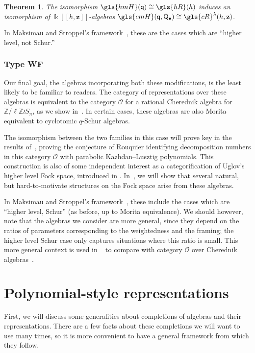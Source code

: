 \documentclass[10pt]{article}
\newtheorem{theorem}{Theorem}[section]
\theoremstyle{definition}
\newcommand{\Bz}{\mathbf{z}}
\newcommand{\pq}{\mathsf{q}}
\newcommand{\K}{\Bbbk}%
\newcommand{\Z}{\mathbb{Z}}
\newcommand{\la}{\lambda}
\newcommand{\PQ}{\mathsf{Q}}
\newcommand{\cO}{\mathcal{O}}
\newcommand{\hmH}{\gls{hmH}}
\newcommand{\hR}{\gls{hR}}
\newcommand\llbracket{[\![}
\newcommand\rrbracket{]\!]}
\begin{document}
\begin{theorem}
 The isomorphism $\hmH(\pq)\cong \hR(h)$ induces an isomorphism of
 $\K\llbracket h,\Bz\rrbracket $-algebras $\gls{cmH}(\pq,\PQ_\bullet)\cong \gls{cR}^{\la}(h,\Bz)$.
\end{theorem}


In Maksimau and Stroppel's framework~\cite{MS18}, these are the cases which are
 ``higher level, not Schur.''

\subsubsection*{Type WF} 

Our final goal, the algebras incorporating both these modifications,
is the least likely to be familiar to readers. The category of
representations over these algebras is equivalent to the category
$\cO$ for a rational Cherednik algebra for $\Z/\ell\Z \wr S_n $, as
we show in~\cite{WebRou}. In certain cases, these algebras are also
Morita equivalent to cyclotomic $q$-Schur algebras.

The isomorphism between the two families in
this case will prove key in the results of~\cite{WebRou}, proving the
conjecture of Rouquier identifying decomposition numbers in this
category $\cO$ with parabolic Kazhdan--Lusztig polynomials. This
construction is also of some independent interest as a
categorification of Uglov's higher level Fock space, introduced in
\cite{Uglov}. In~\cite{WebRou}, we will show that several natural,
but hard-to-motivate structures on the Fock space arise from these
algebras.

In Maksimau and Stroppel's framework~\cite{MS18}, these include the cases which are
 ``higher level, Schur'' (as before, up to Morita equivalence). We should however, note that the algebras
 we consider are more general, since they depend on the ratios of
 parameters corresponding to the weightedness and the framing; the
 higher level Schur case only captures situations where this ratio is
 small. This more general context is used in
~\cite{WebRou,Webalt} to compare with category $\cO$ over Cherednik
 algebras~\cite{GGOR}.




\section{Polynomial-style representations}
\label{sec:polyn-style-repr}
First, we will discuss some generalities about completions of algebras
and their representations. There are a few facts about these
completions we will want to use many times, so it is more convenient
to have a general framework from which they follow. 
\end{document}
